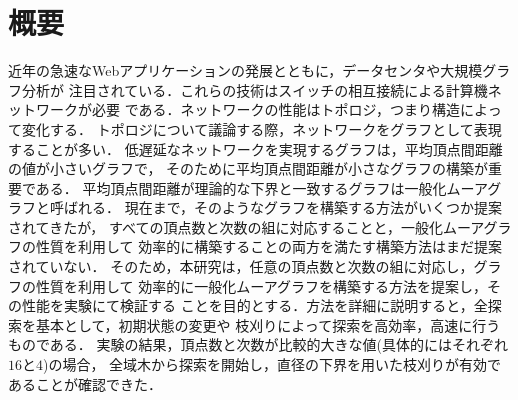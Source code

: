 
\chapter*{概要}
近年の急速なWebアプリケーションの発展とともに，データセンタや大規模グラフ分析が
注目されている．これらの技術はスイッチの相互接続による計算機ネットワークが必要
である．ネットワークの性能はトポロジ，つまり構造によって変化する．
トポロジについて議論する際，ネットワークをグラフとして表現することが多い．
低遅延なネットワークを実現するグラフは，平均頂点間距離の値が小さいグラフで，
そのために平均頂点間距離が小さなグラフの構築が重要である．
平均頂点間距離が理論的な下界と一致するグラフは一般化ムーアグラフと呼ばれる．
現在まで，そのようなグラフを構築する方法がいくつか提案されてきたが，
すべての頂点数と次数の組に対応することと，一般化ムーアグラフの性質を利用して
効率的に構築することの両方を満たす構築方法はまだ提案されていない．
そのため，本研究は，任意の頂点数と次数の組に対応し，グラフの性質を利用して
効率的に一般化ムーアグラフを構築する方法を提案し，その性能を実験にて検証する
ことを目的とする．方法を詳細に説明すると，全探索を基本として，初期状態の変更や
枝刈りによって探索を高効率，高速に行うものである．
実験の結果，頂点数と次数が比較的大きな値(具体的にはそれぞれ$16$と$4$)の場合，
全域木から探索を開始し，直径の下界を用いた枝刈りが有効であることが確認できた．

\begin{comment}
\begingroup
\renewcommand{\cleardoublepage}{}
\renewcommand{\clearpage}{}
\chapter*{Abstract}
\endgroup
In recent years, 

\end{comment}
